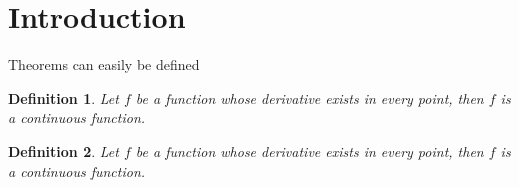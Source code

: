 \documentclass{article}
\newtheorem{definition}{Definition}
\begin{document}
\section{Introduction}
Theorems can easily be defined

\begin{definition}
	\label{def:label1}
	Let $f$ be a function whose derivative exists in every point, then $f$ is a continuous function.
\end{definition}
 
\begin{definition} %
	\label{def:label2}
	Let $f$ be a function whose derivative exists in every point, then $f$ is a continuous function.
\end{definition}


\end{document}
